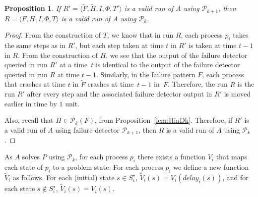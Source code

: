 \documentclass[11pt]{article}
\newtheorem{proposition}{Proposition}[section]
\newcommand{\PFD}{\ensuremath{\mathcal{P}}}
\newcommand{\problem}{P} \newcommand{\Alg}{A}
\begin{document}
\begin{proposition}\label{lem:RIsAValidRun}
If $R'=\langle \widetilde{F}, \widetilde{H}, I, \Phi, T' \rangle$ is a
     valid run of $\Alg$ using $\PFD_{k+1}$, then $R=\langle F, H, I,
     \Phi, T \rangle$ is a valid run of $\Alg$ using $\PFD_{k}$.
\end{proposition}
\begin{proof}
From the construction of $T$, we know that in run $R$, each process
     $p_i$ takes the same steps as in $R'$, but each step taken
     at time $t$ in $R'$ is taken at time $t-1$ in $R$.
From the construction of $H$, we see that the output of the failure
     detector queried in run $R'$ at a time~$t$ is identical to the
     output of the failure detector queried in run $R$ at time $t-1$.
Similarly, in the failure pattern $F$, each process that crashes at time
     $t$ in $\widetilde{F}$ crashes at time~$t-1$ in~$F$.
Therefore, the run $R$ is the run $R'$ after every step and the
     associated failure detector output in $R'$ is moved earlier in
     time by $1$ unit.

Also, recall that  $H \in \PFD_k(F)$, from Proposition~\ref{lem:HinDk}.
Therefore, if $R'$ is a valid run of $\Alg$ using failure detector
     $\PFD_{k+1}$, then $R$ is a valid run of $\Alg$ using $\PFD_{k}$.
\end{proof}
 

As $\Alg$ solves $\problem$ using $\PFD_k$, for each process $p_i$
     there exists a function $V_i$ that maps each state of $p_i$ to a
     problem state.
For each process $p_i$ we define a new function $\widetilde{V}_i$ as
     follows.
For each (initial) state $s \in S^\star_i$, $\widetilde{V}_i(s) =
     V_i(delay_{i}(s))$, and for each state  $s \notin  S^\star_i$,
     $\widetilde{V}_i(s) = V_i(s)$.
\end{document}
